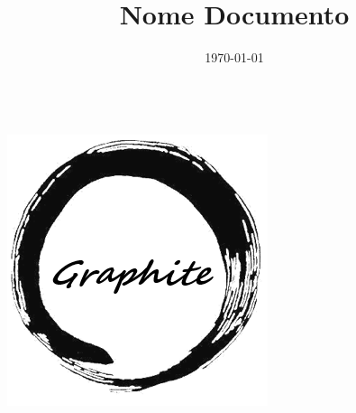 \documentclass[openany,12pt,a4paper]{report}
\title{Nome Documento}
\author{}
\date{\today}
\begin{document}
	\makeatletter
	\begin{titlepage}
		\begin{center}
			{\huge \bfseries  \@title }\\[15ex] 
			\includegraphics[width=0.5\linewidth]{./img/Logo.png}\\
			[40ex] 
			{\large \@date}
		\end{center}
	\end{titlepage}
	\makeatother
	\thispagestyle{empty}
	\newpage
	\tableofcontents
	
	
	

	
\end{document}
